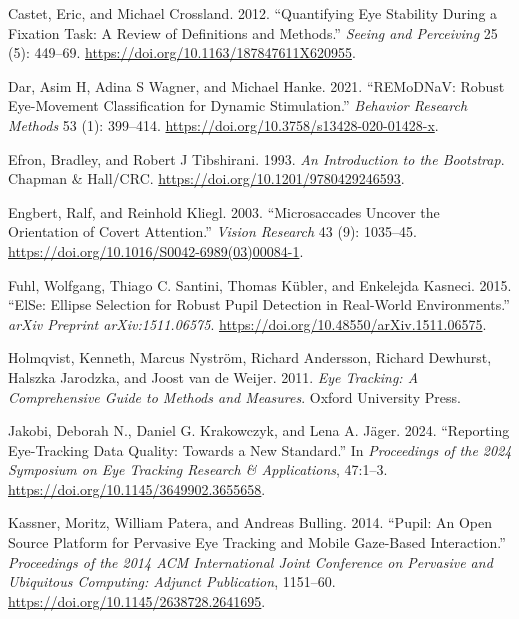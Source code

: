 \documentclass[
]{article}
\newlength{\cslhangindent}
\newenvironment{CSLReferences}[2] %
 {\begin{list}{}{%
  \setlength{\itemindent}{0pt}
  \setlength{\leftmargin}{0pt}
  \setlength{\parsep}{0pt}
  \ifodd #1
   \setlength{\leftmargin}{\cslhangindent}
   \setlength{\itemindent}{-1\cslhangindent}
  \fi
  \setlength{\itemsep}{#2\baselineskip}}}
 {\end{list}}
\begin{document}
\begin{CSLReferences}{1}{0}
Castet, Eric, and Michael Crossland. 2012. {``Quantifying Eye Stability
During a Fixation Task: A Review of Definitions and Methods.''}
\emph{Seeing and Perceiving} 25 (5): 449--69.
\url{https://doi.org/10.1163/187847611X620955}.

Dar, Asim H, Adina S Wagner, and Michael Hanke. 2021. {``REMoDNaV:
Robust Eye-Movement Classification for Dynamic Stimulation.''}
\emph{Behavior Research Methods} 53 (1): 399--414.
\url{https://doi.org/10.3758/s13428-020-01428-x}.

Efron, Bradley, and Robert J Tibshirani. 1993. \emph{An Introduction to
the Bootstrap}. Chapman \& Hall/CRC.
\url{https://doi.org/10.1201/9780429246593}.

Engbert, Ralf, and Reinhold Kliegl. 2003. {``Microsaccades Uncover the
Orientation of Covert Attention.''} \emph{Vision Research} 43 (9):
1035--45. \url{https://doi.org/10.1016/S0042-6989(03)00084-1}.

Fuhl, Wolfgang, Thiago C. Santini, Thomas Kübler, and Enkelejda Kasneci.
2015. {``ElSe: Ellipse Selection for Robust Pupil Detection in
Real-World Environments.''} \emph{arXiv Preprint arXiv:1511.06575}.
\url{https://doi.org/10.48550/arXiv.1511.06575}.

Holmqvist, Kenneth, Marcus Nyström, Richard Andersson, Richard Dewhurst,
Halszka Jarodzka, and Joost van de Weijer. 2011. \emph{Eye Tracking: A
Comprehensive Guide to Methods and Measures}. Oxford University Press.

Jakobi, Deborah N., Daniel G. Krakowczyk, and Lena A. Jäger. 2024.
{``Reporting Eye-Tracking Data Quality: Towards a New Standard.''} In
\emph{Proceedings of the 2024 Symposium on Eye Tracking Research \&
Applications}, 47:1--3. \url{https://doi.org/10.1145/3649902.3655658}.

Kassner, Moritz, William Patera, and Andreas Bulling. 2014. {``Pupil: An
Open Source Platform for Pervasive Eye Tracking and Mobile Gaze-Based
Interaction.''} \emph{Proceedings of the 2014 ACM International Joint
Conference on Pervasive and Ubiquitous Computing: Adjunct Publication},
1151--60. \url{https://doi.org/10.1145/2638728.2641695}.


\end{CSLReferences}
\end{document}
